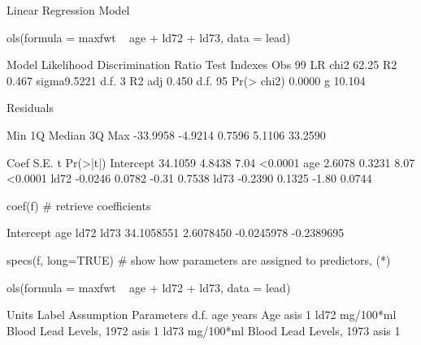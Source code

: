 \begin{Schunk}
\begin{Soutput}
Linear Regression Model
 
 ols(formula = maxfwt ~ age + ld72 + ld73, data = lead)
 
 
                Model Likelihood     Discrimination    
                   Ratio Test           Indexes        
 Obs      99    LR chi2     62.25    R2       0.467    
 sigma9.5221    d.f.            3    R2 adj   0.450    
 d.f.     95    Pr(> chi2) 0.0000    g       10.104    
 
 Residuals
 
      Min       1Q   Median       3Q      Max 
 -33.9958  -4.9214   0.7596   5.1106  33.2590 
 
 
           Coef    S.E.   t     Pr(>|t|)
 Intercept 34.1059 4.8438  7.04 <0.0001 
 age        2.6078 0.3231  8.07 <0.0001 
 ld72      -0.0246 0.0782 -0.31 0.7538  
 ld73      -0.2390 0.1325 -1.80 0.0744  
 
\end{Soutput}
\begin{Sinput}
coef(f)   # retrieve coefficients
\end{Sinput}
\begin{Soutput}
 Intercept        age       ld72       ld73 
34.1058551  2.6078450 -0.0245978 -0.2389695 
\end{Soutput}
\begin{Sinput}
specs(f, long=TRUE)   # show how parameters are assigned to predictors, (*\ipacue*)
\end{Sinput}
\begin{Soutput}
ols(formula = maxfwt ~ age + ld72 + ld73, data = lead)

     Units     Label                   Assumption Parameters d.f.
age  years     Age                     asis                  1   
ld72 mg/100*ml Blood Lead Levels, 1972 asis                  1   
ld73 mg/100*ml Blood Lead Levels, 1973 asis                  1   


\end{Soutput}
\end{Schunk}

